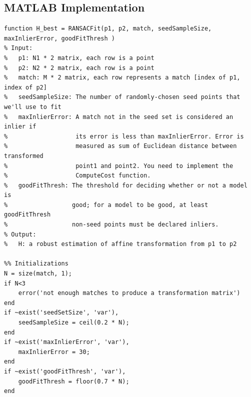 \documentclass{article}
\begin{document}
\subsection{MATLAB Implementation}
\begin{lstlisting}[caption={My implementation of RANSACFit function.},captionpos=b]
function H_best = RANSACFit(p1, p2, match, seedSampleSize, maxInlierError, goodFitThresh )
% Input:
%   p1: N1 * 2 matrix, each row is a point
%   p2: N2 * 2 matrix, each row is a point
%   match: M * 2 matrix, each row represents a match [index of p1, index of p2]
%   seedSampleSize: The number of randomly-chosen seed points that we'll use to fit
%   maxInlierError: A match not in the seed set is considered an inlier if
%                   its error is less than maxInlierError. Error is
%                   measured as sum of Euclidean distance between transformed
%                   point1 and point2. You need to implement the
%                   ComputeCost function.
%   goodFitThresh: The threshold for deciding whether or not a model is
%                  good; for a model to be good, at least goodFitThresh
%                  non-seed points must be declared inliers.
% Output:
%   H: a robust estimation of affine transformation from p1 to p2

%% Initializations
N = size(match, 1);
if N<3
    error('not enough matches to produce a transformation matrix')
end
if ~exist('seedSetSize', 'var'),
    seedSampleSize = ceil(0.2 * N);
end
if ~exist('maxInlierError', 'var'),
    maxInlierError = 30;
end
if ~exist('goodFitThresh', 'var'),
    goodFitThresh = floor(0.7 * N);
end


\end{lstlisting}
\end{document}
